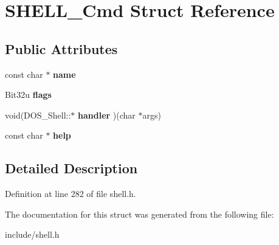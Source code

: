 \hypertarget{structSHELL__Cmd}{\section{S\-H\-E\-L\-L\-\_\-\-Cmd Struct Reference}
\label{structSHELL__Cmd}
}
\subsection*{Public Attributes}
\begin{DoxyCompactItemize}
\item 
\hypertarget{structSHELL__Cmd_a6c2bf878ebb62d9d05eed4e6228ff04b}{const char $\ast$ {\bfseries name}}\label{structSHELL__Cmd_a6c2bf878ebb62d9d05eed4e6228ff04b}

\item 
\hypertarget{structSHELL__Cmd_ae3518365a82721ce9f0b88ba409a36aa}{Bit32u {\bfseries flags}}\label{structSHELL__Cmd_ae3518365a82721ce9f0b88ba409a36aa}

\item 
\hypertarget{structSHELL__Cmd_a8ab69bb42cfd5dd8ca2cf15ce980ebf4}{void(D\-O\-S\-\_\-\-Shell\-::$\ast$ {\bfseries handler} )(char $\ast$args)}\label{structSHELL__Cmd_a8ab69bb42cfd5dd8ca2cf15ce980ebf4}

\item 
\hypertarget{structSHELL__Cmd_a3712fa3ab7cdfbbb384eee27e23b07f2}{const char $\ast$ {\bfseries help}}\label{structSHELL__Cmd_a3712fa3ab7cdfbbb384eee27e23b07f2}

\end{DoxyCompactItemize}


\subsection{Detailed Description}


Definition at line 282 of file shell.\-h.



The documentation for this struct was generated from the following file\-:\begin{DoxyCompactItemize}
\item 
include/shell.\-h\end{DoxyCompactItemize}
